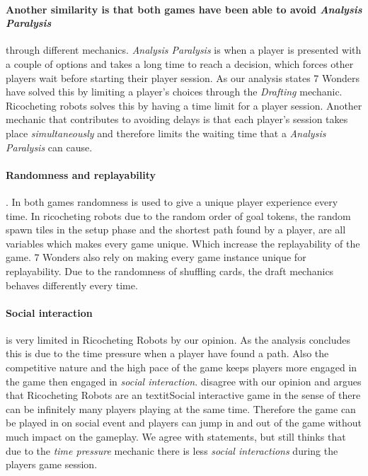 \documentclass[a4paper]{article}
\begin{document}
  \paragraph{Another similarity is that both games have been able to avoid \textit{Analysis Paralysis}} through different mechanics.
  \textit{Analysis Paralysis} is when a player is presented with a couple of options and takes a long time to reach a decision, which forces other players wait before starting their player session.
  As our analysis states 7 Wonders have solved this by limiting a player's choices through the \textit{Drafting} mechanic.
  Ricocheting robots solves this by having a time limit for a player session.
  Another mechanic that contributes to avoiding delays is that each player's session takes place \textit{simultaneously} and therefore limits the waiting time that a \textit{Analysis Paralysis} can cause.

  \paragraph{Randomness and replayability}.
  In both games randomness is used to give a unique player experience every time.
  In ricocheting robots due to the random order of goal tokens, the random spawn tiles in the setup phase and the shortest path found by a player, are all variables which makes every game unique. Which increase the replayability of the game. 7 Wonders also rely on making every game instance unique for replayability. Due to the randomness of shuffling cards, the draft mechanics behaves differently every time.

  \paragraph{Social interaction} is very limited in Ricocheting Robots by our opinion.
  As the analysis concludes this is due to the time pressure when a player have found a path.
  Also the competitive nature and the high pace of the game keeps players more engaged in the game then engaged in \textit{social interaction}.
   disagree with our opinion and argues that Ricocheting Robots are an textit{Social interactive} game in the sense of there can be infinitely many players playing at the same time.
  Therefore the game can be played in on social event and players can jump in and out of the game without much impact on the gameplay.
  We agree with \citeauthor{danbeckRR} statements, but still thinks that due to the \textit{time pressure} mechanic there is less \textit{social interactions} during the players game session.
\end{document}
